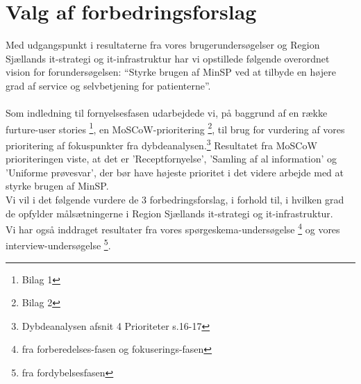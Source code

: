 %
%
%
%
%
%
%
%
%
%
%
%
%
%
%
%
%
%
%
%
%
%
%
%
%
%
%
%
%
\section{Valg af forbedringsforslag}
Med udgangspunkt i resultaterne fra vores brugerundersøgelser og Region Sjællands it-strategi og it-infrastruktur har vi opstillede følgende overordnet vision for forundersøgelsen: “Styrke brugen af MinSP ved at tilbyde en højere grad af service og selvbetjening for patienterne”.\\
\\
Som indledning til fornyelsesfasen udarbejdede vi, på baggrund af en række furture-user stories \footnote{Bilag 1}, en MoSCoW-prioritering \footnote{Bilag 2}, til brug for vurdering af vores prioritering af fokuspunkter fra dybdeanalysen.\footnote{Dybdeanalysen afsnit 4 Prioriteter s.16-17}
Resultatet fra MoSCoW prioriteringen viste, 
at det er 'Receptfornyelse', 'Samling af al information' og 'Uniforme prøvesvar', der bør have højeste prioritet i det videre arbejde med at styrke brugen af MinSP.\\  %
Vi vil i det følgende vurdere de 3 forbedringsforslag, i forhold til,
i hvilken grad de opfylder målsætningerne i Region Sjællands it-strategi og it-infrastruktur. \\
Vi har også inddraget resultater fra vores spørgeskema-undersøgelse \footnote{fra forberedelses-fasen og fokuserings-fasen} og vores interview-undersøgelse \footnote{fra fordybelsesfasen}.
